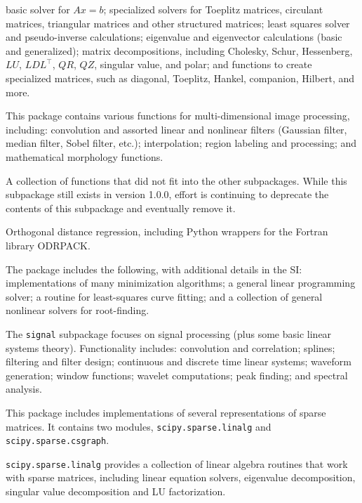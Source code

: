 \begin{description}[leftmargin=!, labelwidth=\widthof{\bfseries \texttt{interpolate}}]
    basic solver for $Ax = b$;
    specialized solvers for Toeplitz matrices, circulant matrices, triangular
    matrices and other structured matrices; least squares solver and
    pseudo-inverse calculations; eigenvalue and eigenvector calculations
    (basic and generalized); matrix decompositions, including Cholesky, Schur,
    Hessenberg, $LU$, $LDL^{\intercal}$, $QR$, $QZ$, singular value, and polar;
    and functions to create specialized matrices, such as diagonal, Toeplitz,
    Hankel, companion, Hilbert, and more.
\item[\texttt{ndimage}]
    This package contains various functions for multi-dimensional image
    processing, including: convolution and assorted linear and nonlinear
    filters (Gaussian filter, median filter, Sobel filter, etc.);
    interpolation; region labeling and processing; and mathematical morphology
    functions.
\item[\texttt{misc}]
    A collection of functions that did not fit into the other subpackages.
    While this subpackage still exists in version 1.0.0, effort is continuing
    to deprecate the contents of this subpackage and eventually remove it.
\item[\texttt{odr}]
    Orthogonal distance regression, including Python wrappers for the Fortran
    library ODRPACK.
\item[\texttt{optimize}]
    The package includes the following, with additional details in the SI:
    implementations of many minimization algorithms; a general linear
    programming solver; a routine for least-squares curve fitting; and a
    collection of general nonlinear solvers for root-finding.
\item[\texttt{signal}]
    The \texttt{signal} subpackage focuses on signal processing (plus some
    basic linear systems theory).  Functionality includes:
    convolution and correlation; splines; filtering and filter design;
    continuous and discrete time linear systems; waveform generation;
    window functions; wavelet computations; peak finding; and spectral
    analysis.  
\item[\texttt{sparse}]
    This package includes implementations of several representations of
    sparse matrices.  It contains two modules, 
    \texttt{scipy.sparse.linalg} and \texttt{scipy.sparse.csgraph}.

    \texttt{scipy.sparse.linalg} provides a collection of linear algebra
    routines that work with sparse matrices, including linear equation
    solvers, eigenvalue decomposition, singular value decomposition
    and LU factorization.


\end{description}

